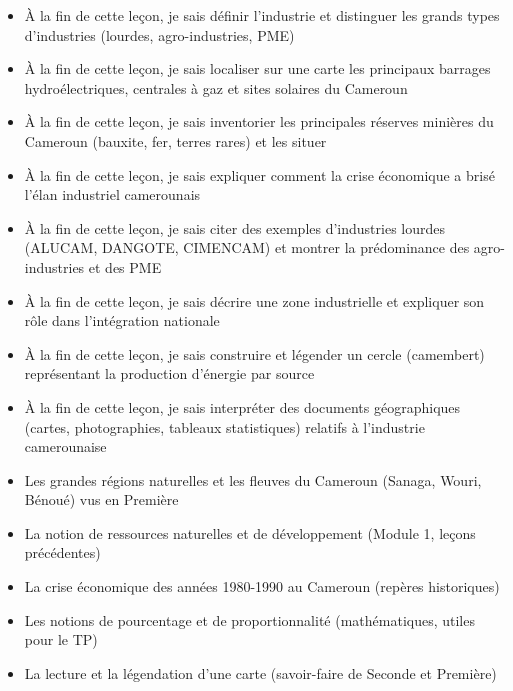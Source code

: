 \documentclass[11pt]{article}
\begin{document}
\begin{objectifs}
\begin{itemize}
\item À la fin de cette leçon, je sais définir l'industrie et distinguer les grands types d'industries (lourdes, agro-industries, PME)
\item À la fin de cette leçon, je sais localiser sur une carte les principaux barrages hydroélectriques, centrales à gaz et sites solaires du Cameroun
\item À la fin de cette leçon, je sais inventorier les principales réserves minières du Cameroun (bauxite, fer, terres rares) et les situer
\item À la fin de cette leçon, je sais expliquer comment la crise économique a brisé l'élan industriel camerounais
\item À la fin de cette leçon, je sais citer des exemples d'industries lourdes (ALUCAM, DANGOTE, CIMENCAM) et montrer la prédominance des agro-industries et des PME
\item À la fin de cette leçon, je sais décrire une zone industrielle et expliquer son rôle dans l'intégration nationale
\item À la fin de cette leçon, je sais construire et légender un cercle (camembert) représentant la production d'énergie par source
\item À la fin de cette leçon, je sais interpréter des documents géographiques (cartes, photographies, tableaux statistiques) relatifs à l'industrie camerounaise
\end{itemize}
\end{objectifs}

\begin{prerequis}
\begin{itemize}
\item Les grandes régions naturelles et les fleuves du Cameroun (Sanaga, Wouri, Bénoué) vus en Première
\item La notion de ressources naturelles et de développement (Module 1, leçons précédentes)
\item La crise économique des années 1980-1990 au Cameroun (repères historiques)
\item Les notions de pourcentage et de proportionnalité (mathématiques, utiles pour le TP)
\item La lecture et la légendation d'une carte (savoir-faire de Seconde et Première)
\end{itemize}
\end{prerequis}
\end{document}

